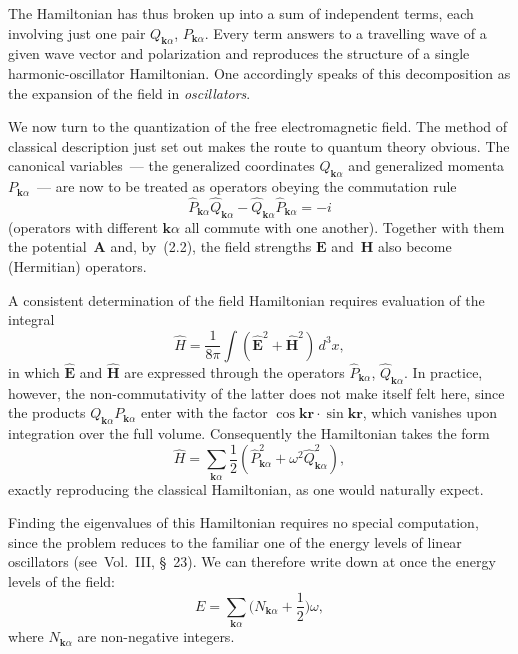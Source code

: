The Hamiltonian has thus broken up into a sum of independent terms, each involving just one pair $Q_{\mathbf{k}\alpha}$, $P_{\mathbf{k}\alpha}$. Every term answers to a travelling wave of a given wave vector and polarization and reproduces the structure of a single harmonic-oscillator Hamiltonian. One accordingly speaks of this decomposition as the expansion of the field in \emph{oscillators}.

We now turn to the quantization of the free electromagnetic field. The method of classical description just set out makes the route to quantum theory obvious. The canonical variables~--- the generalized coordinates $Q_{\mathbf{k}\alpha}$ and generalized momenta $P_{\mathbf{k}\alpha}$~--- are now to be treated as operators obeying the commutation rule
\begin{equation}
\hat{P}_{\mathbf{k}\alpha}\hat{Q}_{\mathbf{k}\alpha} - \hat{Q}_{\mathbf{k}\alpha}\hat{P}_{\mathbf{k}\alpha} = -i
\tag{2.9}
\end{equation}
(operators with different $\mathbf{k}\alpha$ all commute with one another). Together with them the potential~$\mathbf{A}$ and, by~(2.2), the field strengths $\mathbf{E}$ and~$\mathbf{H}$ also become (Hermitian) operators.

A consistent determination of the field Hamiltonian requires evaluation of the integral
\begin{equation}
\hat{H} = \frac{1}{8\pi}\int (\hat{\mathbf{E}}^2 + \hat{\mathbf{H}}^2)\,d^3x,
\tag{2.10}
\end{equation}
in which $\hat{\mathbf{E}}$ and $\hat{\mathbf{H}}$ are expressed through the operators $\hat{P}_{\mathbf{k}\alpha}$, $\hat{Q}_{\mathbf{k}\alpha}$. In practice, however, the non-commutativity of the latter does not make itself felt here, since the products $Q_{\mathbf{k}\alpha} P_{\mathbf{k}\alpha}$ enter with the factor $\cos\mathbf{kr}\cdot\sin\mathbf{kr}$, which vanishes upon integration over the full volume. Consequently the Hamiltonian takes the form
\begin{equation}
\hat{H} = \sum_{\mathbf{k}\alpha} \frac{1}{2}(\hat{P}_{\mathbf{k}\alpha}^2 + \omega^2 \hat{Q}_{\mathbf{k}\alpha}^2),
\tag{2.11}
\end{equation}
exactly reproducing the classical Hamiltonian, as one would naturally expect.

Finding the eigenvalues of this Hamiltonian requires no special computation, since the problem reduces to the familiar one of the energy levels of linear oscillators (see~Vol.~III, \S~23). We can therefore write down at once the energy levels of the field:
\begin{equation}
E = \sum_{\mathbf{k}\alpha}\biggl(N_{\mathbf{k}\alpha} + \frac{1}{2}\biggr)\omega,
\tag{2.12}
\end{equation}
where $N_{\mathbf{k}\alpha}$ are non-negative integers.

